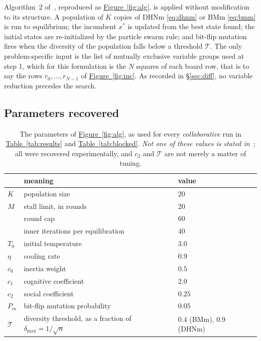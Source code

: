 \documentclass{easychair}
\newcommand{\secref}[1]{\hyperref[#1]{\textcolor{academicpurple}{\S\ref*{#1}}}}
\newcommand{\citeref}[1]{\textcolor{academicpurple}{\cite{#1}}}
\newcommand{\tabref}[1]{\textcolor{academicpurple}{\hyperref[#1]{Table~\ref*{#1}}}}
\newcommand{\figref}[1]{\textcolor{academicpurple}{\hyperref[#1]{Figure~\ref*{#1}}}}
\begin{document}
Algorithm~2 of~\citeref{liwang2022}, reproduced as \figref{fig:alg}, is applied without modification
to its structure. A population of $K$ copies of DHNm \eqref{eq:dhnm} or BMm \eqref{eq:bmm} is run to
equilibrium; the incumbent $x^{*}$ is updated from the best state found; the initial states are
re-initialized by the particle swarm rule; and bit-flip mutation fires when the diversity of the
population falls below a threshold $\mathcal{T}$. The only problem-specific input is the list of
mutually exclusive variable groups used at step 1, which for this formulation is the $N$ squares of
each board row, that is to say the rows $r_0,\dots,r_{N-1}$ of \figref{fig:inc}. As recorded in
\secref{sec:diff}, no variable reduction precedes the search.

\subsection{Parameters recovered}\label{sec:params}

\begin{table}[t]
\centering\small
\setlength{\tabcolsep}{5pt}
\begin{tabular}{@{}l p{} l@{}}
\toprule
& meaning & value\\
\midrule
$K$            & population size                                     & $20$\\
$M$            & stall limit, in rounds                              & $20$\\
               & round cap                                           & $60$\\
               & inner iterations per equilibration                  & $40$\\
$T_0$          & initial temperature                                 & $3.0$\\
$\eta$         & cooling rate                                        & $0.9$\\
$c_0$          & inertia weight                                      & $0.5$\\
$c_1$          & cognitive coefficient                               & $2.0$\\
$c_2$          & social coefficient                                  & $0.25$\\
$P_m$          & bit-flip mutation probability                       & $0.05$\\
$\mathcal{T}$  & diversity threshold, as a fraction of $\delta_{\max} = 1/\sqrt{n}$
               & $0.4$ (BMm), $0.9$ (DHNm)\\
\bottomrule
\end{tabular}
\caption{The parameters of \figref{fig:alg}, as used for every \emph{collaborative} run in
\tabref{tab:results} and \tabref{tab:blocked}. \emph{Not one of these values is stated
in~\citeref{liwang2022}}; all were
recovered experimentally, and $c_2$ and $\mathcal{T}$ are not merely a matter of
tuning.}\label{tab:params}
\end{table}
\end{document}
